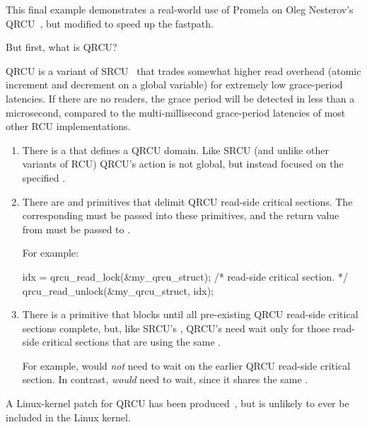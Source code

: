 This final example demonstrates a real-world use of Promela on Oleg
Nesterov's
QRCU~\cite{OlegNesterov2006QRCU,OlegNesterov2006aQRCU},
but modified to speed up the 
fastpath.

But first, what is QRCU?

QRCU is a variant of SRCU~\cite{PaulEMcKenney2006c}
that trades somewhat higher read overhead
(atomic increment and decrement on a global variable) for extremely
low grace-period latencies.
If there are no readers, the grace period will be detected in less
than a microsecond, compared to the multi-millisecond grace-period
latencies of most other RCU implementations.

\begin{enumerate}
\item	There is a  that defines a QRCU domain.
	Like SRCU (and unlike other variants of RCU) QRCU's action
	is not global, but instead focused on the specified
	.
\item	There are  and 
	primitives that delimit QRCU read-side critical sections.
	The corresponding  must be passed into
	these primitives, and the return value from 
	must be passed to .

	For example:

\begin{VerbatimU}
idx = qrcu_read_lock(&my_qrcu_struct);
/* read-side critical section. */
qrcu_read_unlock(&my_qrcu_struct, idx);
\end{VerbatimU}

\item	There is a  primitive that blocks until
	all pre-existing QRCU read-side critical sections complete,
	but, like SRCU's , QRCU's
	 need wait only for those read-side
	critical sections that are using the same .

	For example, 
	would \emph{not} need to wait on the earlier QRCU read-side
	critical section.
	In contrast, 
	\emph{would} need to wait, since it shares the same
	.
\end{enumerate}

A Linux-kernel patch for QRCU has been
produced~\cite{PaulMcKenney2007QRCUpatch},
but is unlikely to ever be included in the Linux kernel.

